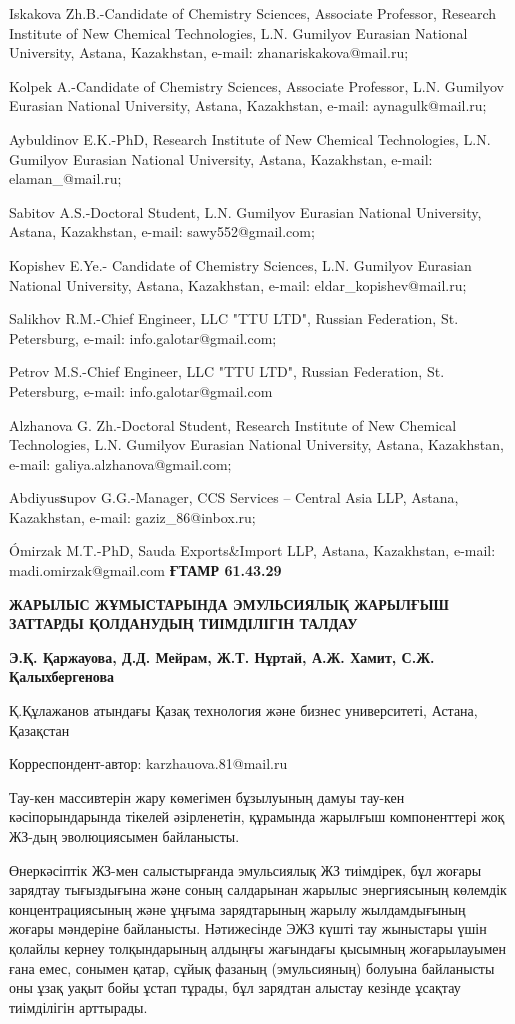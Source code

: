 Iskakova Zh.B.-Candidate of Chemistry Sciences, Associate Professor,
Research Institute of New Chemical Technologies, L.N. Gumilyov Eurasian
National University, Astana, Kazakhstan, e-mail: zhanariskakova@mail.ru;

Kolpek A.-Candidate of Chemistry Sciences, Associate Professor, L.N.
Gumilyov Eurasian National University, Astana, Kazakhstan, e-mail:
aynagulk@mail.ru;

Aybuldinov E.K.-PhD, Research Institute of New Chemical Technologies,
L.N. Gumilyov Eurasian National University, Astana, Kazakhstan, e-mail:
elaman\_@mail.ru;

Sabitov A.S.-Doctoral Student, L.N. Gumilyov Eurasian National
University, Astana, Kazakhstan, e-mail: sawy552@gmail.com;

Kopishev E.Ye.- Candidate of Chemistry Sciences, L.N. Gumilyov Eurasian
National University, Astana, Kazakhstan, e-mail:
eldar\_kopishev@mail.ru;

Salikhov R.M.-Chief Engineer, LLC "TTU LTD", Russian Federation, St.
Petersburg, e-mail: info.galotar@gmail.com;

Petrov M.S.-Chief Engineer, LLC "TTU LTD", Russian Federation, St.
Petersburg, e-mail: info.galotar@gmail.com

Alzhanova G. Zh.-Doctoral Student, Research Institute of New Chemical
Technologies, L.N. Gumilyov Eurasian National University, Astana,
Kazakhstan, e-mail: galiya.alzhanova@gmail.com;

Abdiyus{\bfseries s}upov G.G.-Manager, CCS Services -- Central Asia LLP,
Astana, Kazakhstan, e-mail: gaziz\_86@inbox.ru;

Ómirzak M.T.-PhD, Sauda Exports\&Import LLP, Astana, Kazakhstan, e-mail:
madi.omirzak@gmail.com\newpage
{\bfseries ҒТАМР 61.43.29}

{\bfseries ЖАРЫЛЫС ЖҰМЫСТАРЫНДА ЭМУЛЬСИЯЛЫҚ ЖАРЫЛҒЫШ ЗАТТАРДЫ ҚОЛДАНУДЫҢ
ТИІМДІЛІГІН ТАЛДАУ}

{\bfseries Э.Қ. Қаржауова, Д.Д. Мейрам, Ж.Т. Нұртай, А.Ж. Хамит, С.Ж.
Қалыхбергенова}

Қ.Құлажанов атындағы Қазақ технология және бизнес университеті, Астана,
Қазақстан

Корреспондент-автор: karzhauova.81@mail.ru

Тау-кен массивтерін жару көмегімен бұзылуының дамуы тау-кен
кәсіпорындарында тікелей әзірленетін, құрамында жарылғыш компоненттері
жоқ ЖЗ-дың эволюциясымен байланысты.

Өнеркәсіптік ЖЗ-мен салыстырғанда эмульсиялық ЖЗ тиімдірек, бұл жоғары
зарядтау тығыздығына және соның салдарынан жарылыс энергиясының көлемдік
концентрациясының және ұңғыма зарядтарының жарылу жылдамдығының жоғары
мәндеріне байланысты. Нәтижесінде ЭЖЗ күшті тау жыныстары үшін қолайлы
кернеу толқындарының алдыңғы жағындағы қысымның жоғарылауымен ғана емес,
сонымен қатар, сұйық фазаның (эмульсияның) болуына байланысты оны ұзақ
уақыт бойы ұстап тұрады, бұл зарядтан алыстау кезінде ұсақтау
тиімділігін арттырады.

